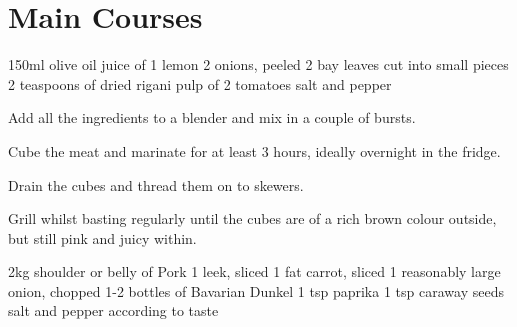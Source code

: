 \chapter{Main Courses}
\minitoc


\begin{ingreds}
	150ml olive oil
	juice of 1 lemon
	2 onions, peeled
	2 bay leaves cut into small pieces
	2 teaspoons of dried rigani
	pulp of 2 tomatoes
	salt and pepper
\end{ingreds}

\begin{method}
Add all the ingredients to a blender and mix in a couple of bursts.

Cube the meat and marinate for at least 3 hours, ideally overnight in the fridge.

Drain the cubes and thread them on to skewers.

Grill whilst basting regularly until the cubes are of a rich brown colour outside, but still pink and juicy within.
\end {method}


\begin{ingreds}
	2kg shoulder or belly of Pork
	1 leek, sliced
	1 fat carrot, sliced
	1 reasonably large onion, chopped
	1-2 bottles of Bavarian Dunkel
	1 tsp paprika
	1 tsp caraway seeds
	salt and pepper according to taste
\end{ingreds}

